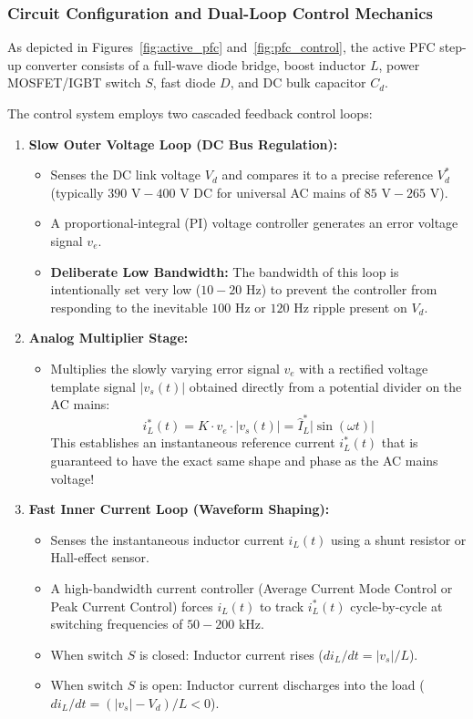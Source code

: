 \documentclass[11pt,a4paper]{article}
\begin{document}
\subsubsection{Circuit Configuration and Dual-Loop Control Mechanics}
As depicted in Figures~\ref{fig:active_pfc} and~\ref{fig:pfc_control}, the active PFC step-up converter consists of a full-wave diode bridge, boost inductor $L$, power MOSFET/IGBT switch $S$, fast diode $D$, and DC bulk capacitor $C_d$.

The control system employs two cascaded feedback control loops:
\begin{enumerate}[leftmargin=*]
  \item \textbf{Slow Outer Voltage Loop (DC Bus Regulation):}
  \begin{itemize}
    \item Senses the DC link voltage $V_d$ and compares it to a precise reference $V_d^*$ (typically $390\text{ V} - 400\text{ V}$ DC for universal AC mains of $85\text{ V} - 265\text{ V}$).
    \item A proportional-integral (PI) voltage controller generates an error voltage signal $v_e$.
    \item \textbf{Deliberate Low Bandwidth:} The bandwidth of this loop is intentionally set very low ($10 - 20\text{ Hz}$) to prevent the controller from responding to the inevitable $100\text{ Hz}$ or $120\text{ Hz}$ ripple present on $V_d$.
  \end{itemize}

  \item \textbf{Analog Multiplier Stage:}
  \begin{itemize}
    \item Multiplies the slowly varying error signal $v_e$ with a rectified voltage template signal $|v_s(t)|$ obtained directly from a potential divider on the AC mains:
    \begin{equation}
    i_L^*(t) = K \cdot v_e \cdot |v_s(t)| = \hat{I}_L^* |\sin(\omega t)|
    \end{equation}
    This establishes an instantaneous reference current $i_L^*(t)$ that is guaranteed to have the exact same shape and phase as the AC mains voltage!
  \end{itemize}

  \item \textbf{Fast Inner Current Loop (Waveform Shaping):}
  \begin{itemize}
    \item Senses the instantaneous inductor current $i_L(t)$ using a shunt resistor or Hall-effect sensor.
    \item A high-bandwidth current controller (Average Current Mode Control or Peak Current Control) forces $i_L(t)$ to track $i_L^*(t)$ cycle-by-cycle at switching frequencies of $50 - 200\text{ kHz}$.
    \item When switch $S$ is closed: Inductor current rises ($di_L/dt = |v_s|/L$).
    \item When switch $S$ is open: Inductor current discharges into the load ($di_L/dt = (|v_s| - V_d)/L < 0$).
  \end{itemize}
\end{enumerate}
\end{document}
